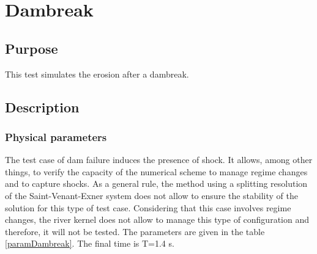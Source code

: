 \chapter{Dambreak}\label{chapter:dambreak}

\section{Purpose}

This test simulates the erosion after a dambreak.

\section{Description}

\subsection{Physical parameters}

The test case of dam failure induces the presence of shock. 
It allows, among other things, to verify the capacity of the numerical
scheme to manage regime changes and to capture shocks.
As a general rule, the method using a splitting resolution of the 
Saint-Venant-Exner system does not allow to ensure the stability of 
the solution for this type of test case.
Considering that this case involves regime changes, the river kernel 
does not allow to manage this type of configuration and therefore, 
it will not be tested.
The parameters are given in the table \ref{paramDambreak}.
The final time is T=1.4 s.

